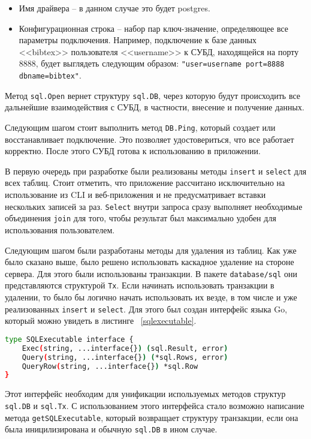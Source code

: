 \begin{itemize}
	\item Имя драйвера -- в данном случае это будет postgres.
	\item Конфигурационная строка -- набор пар ключ-значение, определяющее все параметры подключения. Например,
	      подключение к базе данных <<bibtex>> пользователя <<username>> к СУБД, находящейся на порту 8888, будет выглядеть
	      следующим образом: \texttt{"user=username port=8888 dbname=bibtex"}.
\end{itemize}

Метод \texttt{sql.Open} вернет структуру \texttt{sql.DB}, через которую будут происходить
все дальнейшие взаимодействия с СУБД, в частности, внесение и получение данных.

Следующим шагом стоит выполнить метод \texttt{DB.Ping}, который создает или восстанавливает подключение.
Это позволяет удостовериться, что все работает корректно. После этого СУБД готова к использованию в приложении.

В первую очередь при разработке были реализованы методы \texttt{insert} и \texttt{select} для всех таблиц.
Стоит отметить, что приложение рассчитано исключительно на использование из CLI и веб-приложения и не
предусматривает вставки нескольких записей за раз. \texttt{Select} внутри запроса сразу выполняет
необходимые объединения \texttt{join} для того, чтобы результат был максимально удобен для
использования пользователем.

Следующим шагом были разработаны методы для удаления из таблиц. Как уже было сказано выше,
было решено использовать каскадное удаление на стороне сервера. Для этого были использованы
транзакции. В пакете \texttt{database/sql} они представляются структурой \texttt{Tx}.
Если начинать использовать транзакции в удалении, то было бы логично начать использовать их везде, в том числе
и уже реализованных \texttt{insert} и \texttt{select}. Для этого был создан интерфейс языка Go, который можно увидеть в листинге ~\ref{sqlexecutable}.

\begin{lstlisting}[language=bash, caption = {Интерфейс унификации транзакций.}, captionpos=b, label={sqlexecutable}]
type SQLExecutable interface {
	Exec(string, ...interface{}) (sql.Result, error)
	Query(string, ...interface{}) (*sql.Rows, error)
	QueryRow(string, ...interface{}) *sql.Row
}
\end{lstlisting}

Этот интерфейс необходим для унификации используемых методов структур \texttt{sql.DB} и \texttt{sql.Tx}.
С использованием этого интерфейса стало возможно написание метода \texttt{getSQLExecutable}, который
возвращает структуру транзакции, если она была иницилизирована и обычную \texttt{sql.DB} в ином случае.

